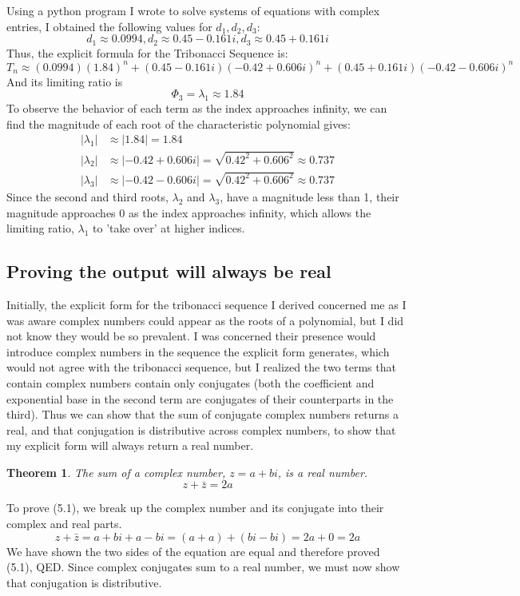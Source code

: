 \documentclass[11pt]{article}
\newtheorem{theorem}{Theorem}[section]
\begin{document}
Using a python program I wrote to solve systems of equations with complex entries, I obtained the following values for $d_1,d_2,d_3$:
\[d_1\approx0.0994,d_2\approx0.45-0.161i,d_3\approx0.45+0.161i\]
Thus, the explicit formula for the Tribonacci Sequence is:
\[T_n\approx(0.0994)(1.84)^n+(0.45-0.161i)(-0.42 + 0.606i)^n+(0.45+0.161i)(-0.42 - 0.606i)^n\]
And its limiting ratio is \[\Phi_3=\lambda_1\approx1.84\]
To observe the behavior of each term as the index approaches infinity, we can find the magnitude of each root of the characteristic polynomial gives: 
\begin{align*}
    |\lambda_1|&\approx|1.84|=1.84 \\
    |\lambda_2|&\approx|-0.42 + 0.606i|=\sqrt{0.42^2+0.606^2}\approx 0.737\\
    |\lambda_3|&\approx|-0.42 - 0.606i|=\sqrt{0.42^2+0.606^2}\approx 0.737
\end{align*}
Since the second and third roots, \(\lambda_2\) and \(\lambda_3\), have a magnitude less than 1, their magnitude approaches 0 as the index approaches infinity, which allows the limiting ratio, \(\lambda_1\) to 'take over' at higher indices. 

\subsection{Proving the output will always be real}
Initially, the explicit form for the tribonacci sequence I derived concerned me as I was aware complex numbers could appear as the roots of a polynomial, but I did not know they would be so prevalent. I was concerned their presence would introduce complex numbers in the sequence the explicit form generates, which would not agree with the tribonacci sequence, but I realized the two terms that contain complex numbers contain only conjugates (both the coefficient and exponential base in the second term are conjugates of their counterparts in the third). Thus we can show that the sum of conjugate complex numbers returns a real, and that conjugation is distributive across complex numbers, to show that my explicit form will always return a real number. 
\begin{theorem}
    The sum of a complex number, \(z=a+bi\), is a real number. 
    \[z+\bar{z}=2a\]
\end{theorem}
To prove (5.1), we break up the complex number and its conjugate into their complex and real parts. 
\[z+\bar{z}=a+bi+a-bi=(a+a)+(bi-bi)=2a+0=2a\]
We have shown the two sides of the equation are equal and therefore proved (5.1), QED.
Since complex conjugates sum to a real number, we must now show that conjugation is distributive.
\end{document}
